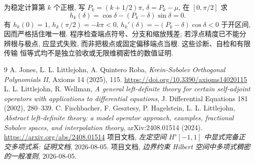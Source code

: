 \documentclass[UTF8]{ctexart}
\begin{document}
为稳定计算第 $k$ 个正根, 写 $P_k=(k+1/2)\pi$, $\delta=P_k-\mu$,
在 $[0,\pi/2]$ 求
\[
 h_k(\delta)=\cos\delta-(P_k-\delta)\sin\delta=0.
\]
有 $h_k(0)=1$, $h_k(\pi/2)=-k\pi<0$,
$h_k'(\delta)=-(P_k-\delta)\cos\delta<0$ 于开区间, 因而严格括住唯一根.
程序检查端点符号、分支和缩放残差; 若浮点精度已不能分辨根与极点,
应显式失败, 而非把极点或固定偏移端点当根. 这些诊断、自检和有限传输
恒等式均不是独立验收或无限维稠密性的数值证明.

\begin{thebibliography}{9}
 A. Jones, L. L. Littlejohn, A. Quintero Roba, \emph{Krein-Sobolev
	Orthogonal Polynomials II}, Axioms 14 (2025), 115.
	\url{https://doi.org/10.3390/axioms14020115}
 L. L. Littlejohn, R. Wellman, \emph{A general left-definite theory
	for certain self-adjoint operators with applications to differential equations},
	J. Differential Equations 181 (2002), 280--339.
 C. Fischbacher, F. Gesztesy, P. Hagelstein, L. L. Littlejohn,
	\emph{Abstract left-definite theory: a model operator approach, examples,
	fractional Sobolev spaces, and interpolation theory}, arXiv:2408.01514 (2024).
	\url{https://arxiv.org/abs/2408.01514}
 项目文档, \emph{左定空间 $H^s[-1,1]$ 中显式完备正交多项式系: 证明文档},
	2026-08-05.
 项目文档, \emph{边界约束 Hilbert 空间中多项式稠密的一般准则},
	2026-08-05.
\end{thebibliography}
\end{document}
